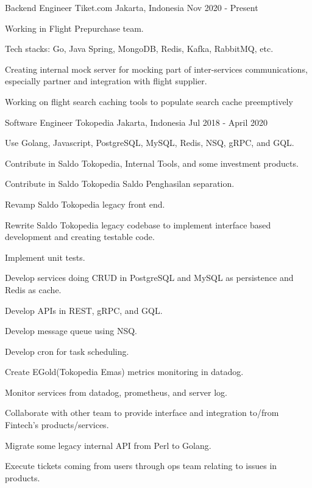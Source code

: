 \begin{cventries}

\cventry
    {Backend Engineer}
    {Tiket.com}
    {Jakarta, Indonesia}
    {Nov 2020 - Present}
    {
        \begin{cvitems}
            \item {Working in Flight Prepurchase team.}
            \item {Tech stacks: Go, Java Spring, MongoDB, Redis, Kafka, RabbitMQ, etc.}
            \item {Creating internal mock server for mocking part of inter-services communications, especially partner and integration with flight supplier.}
            \item {Working on flight search caching tools to populate search cache preemptively}
        \end{cvitems}
    }

\cventry
    {Software Engineer}
    {Tokopedia}
    {Jakarta, Indonesia}
    {Jul 2018 - April 2020}
    {
        \begin{cvitems}
            \item {Use Golang, Javascript, PostgreSQL, MySQL, Redis, NSQ, gRPC, and GQL.}
            \item {Contribute in Saldo Tokopedia, Internal Tools, and some investment products.}
            \item {Contribute in Saldo Tokopedia Saldo Penghasilan separation.}
            \item {Revamp Saldo Tokopedia legacy front end.}
            \item {Rewrite Saldo Tokopedia legacy codebase to implement interface based development and creating testable code.}
            \item {Implement unit tests.}
            \item {Develop services doing CRUD in PostgreSQL and MySQL as persistence and Redis as cache.}
            \item {Develop APIs in REST, gRPC, and GQL.}
            \item {Develop message queue using NSQ.}
            \item {Develop cron for task scheduling.}
            \item {Create EGold(Tokopedia Emas) metrics monitoring in datadog.}
            \item {Monitor services from datadog, prometheus, and server log.}
            \item {Collaborate with other team to provide interface and integration to/from Fintech’s products/services.}
            \item {Migrate some legacy internal API from Perl to Golang.}
            \item {Execute tickets coming from users through ops team relating to issues in products.}
        \end{cvitems}
    }


\end{cventries}
